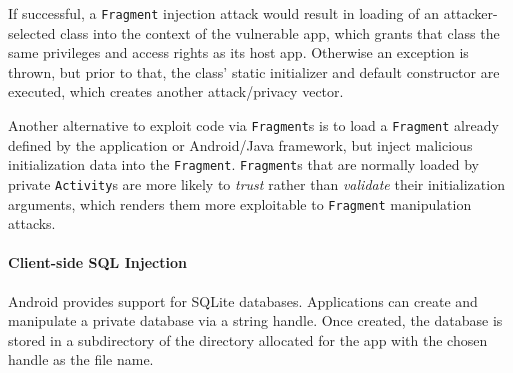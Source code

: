 If successful, a {\tt Fragment} injection attack would result in loading of an attacker-selected class into the context of the vulnerable app, which grants that class the same privileges and access rights as its host app.
Otherwise an exception is thrown, but prior to that, the class' static initializer and default constructor are executed, which creates another attack/privacy vector.

Another alternative to exploit code via {\tt Fragment}s is to load a {\tt Fragment} already defined by the application or Android/Java framework, but inject malicious initialization data into the {\tt Fragment}. {\tt Fragment}s that are normally loaded by private {\tt Activity}s are more likely to \emph{trust} rather than \emph{validate} their initialization arguments, which renders them more exploitable to {\tt Fragment} manipulation attacks.
%


%




\paragraph{Client-side SQL Injection} Android provides support for SQLite databases. Applications can create
and manipulate a private database via a string handle. Once created, the database
is stored in a subdirectory of the directory allocated for the app
with the chosen handle as the file name. 

